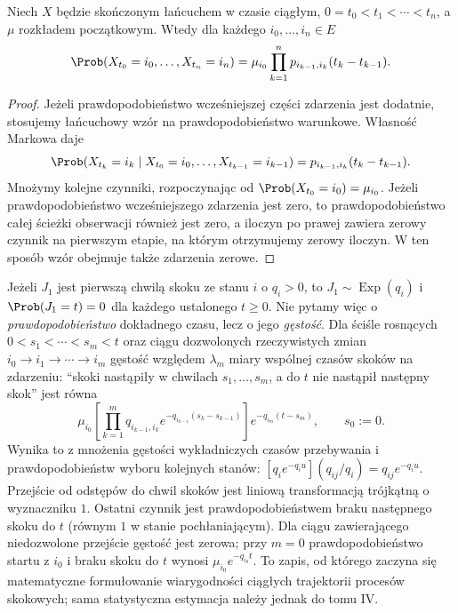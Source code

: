 \begin{stwierdzenie}
Niech $X$ będzie skończonym łańcuchem w czasie ciągłym,
$0=t_0<t_1<\cdots<t_n$, a $\mu$ rozkładem początkowym.
Wtedy dla każdego $i_0,\ldots,i_n\in E$
\[
\Prob(X_{t_0}=i_0,\ldots,X_{t_n}=i_n)
=\mu_{i_0}\prod_{k=1}^n
 p_{i_{k-1},i_k}(t_k-t_{k-1}).
\]
\end{stwierdzenie}
\begin{proof}
Jeżeli prawdopodobieństwo wcześniejszej części zdarzenia
jest dodatnie, stosujemy łańcuchowy wzór na prawdopodobieństwo
warunkowe. Własność Markowa daje
\[
\Prob(X_{t_k}=i_k\mid X_{t_0}=i_0,\ldots,X_{t_{k-1}}=i_{k-1})
=p_{i_{k-1},i_k}(t_k-t_{k-1}).
\]
Mnożymy kolejne czynniki, rozpoczynając od
$\Prob(X_{t_0}=i_0)=\mu_{i_0}$.
Jeżeli prawdopodobieństwo wcześniejszego zdarzenia jest zero,
to prawdopodobieństwo całej ścieżki obserwacji również
jest zero, a iloczyn po prawej zawiera zerowy czynnik
na pierwszym etapie, na którym otrzymujemy zerowy iloczyn.
W ten sposób wzór obejmuje także zdarzenia zerowe.
\end{proof}

\begin{uwaga}
Jeżeli $J_1$ jest pierwszą chwilą skoku ze stanu $i$ o
$q_i>0$, to $J_1\sim\operatorname{Exp}(q_i)$ i
$\Prob(J_1=t)=0$ dla każdego ustalonego $t\ge0$.
Nie pytamy więc o \emph{prawdopodobieństwo} dokładnego czasu,
lecz o jego \emph{gęstość}. Dla ściśle rosnących
$0<s_1<\cdots<s_m<t$ oraz ciągu dozwolonych rzeczywistych
zmian $i_0\to i_1\to\cdots\to i_m$ gęstość względem
$\lambda_m$ miary wspólnej czasów skoków na zdarzeniu:
``skoki nastąpiły w chwilach $s_1,\ldots,s_m$,
a do $t$ nie nastąpił następny skok'' jest równa
\[
\mu_{i_0}\left[\prod_{k=1}^m
q_{i_{k-1},i_k}e^{-q_{i_{k-1}}(s_k-s_{k-1})}\right]
e^{-q_{i_m}(t-s_m)},\qquad s_0:=0.
\]
Wynika to z mnożenia gęstości wykładniczych czasów
przebywania i prawdopodobieństw wyboru kolejnych stanów:
$[q_i e^{-q_i u}](q_{ij}/q_i)=q_{ij}e^{-q_i u}$.
Przejście od odstępów do chwil skoków jest liniową
transformacją trójkątną o wyznaczniku $1$.
Ostatni czynnik jest prawdopodobieństwem braku
następnego skoku do $t$ (równym $1$ w stanie
pochłaniającym). Dla ciągu zawierającego niedozwolone
przejście gęstość jest zerowa; przy $m=0$ prawdopodobieństwo
startu z $i_0$ i braku skoku do $t$ wynosi
$\mu_{i_0}e^{-q_{i_0}t}$.
To zapis, od którego zaczyna się matematyczne formułowanie
wiarygodności ciągłych trajektorii procesów skokowych;
sama statystyczna estymacja należy jednak do tomu IV.
\end{uwaga}

